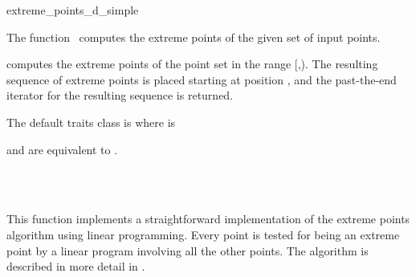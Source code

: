 \ccRefPageBegin


\begin{ccRefFunction}{extreme_points_d_simple}  %


\ccDefinition

The function \ccRefName\ computes the extreme points of the given set of input points.


{computes the extreme points of the point set in the range [,). The resulting sequence of extreme points is placed starting at position , and the past-the-end iterator for the resulting sequence is returned.
}

The default traits class  is  where  is 

\ccRequirements

 and  are equivalent to .

\ccSeeAlso

\\
\\

\ccImplementation
This function implements a straightforward implementation of the extreme points algorithm using linear programming. Every point is tested for being an extreme point by a linear program involving all the other points. The algorithm is described in more detail in \cite{cgal:h-epmhd-10}.


\end{ccRefFunction}
